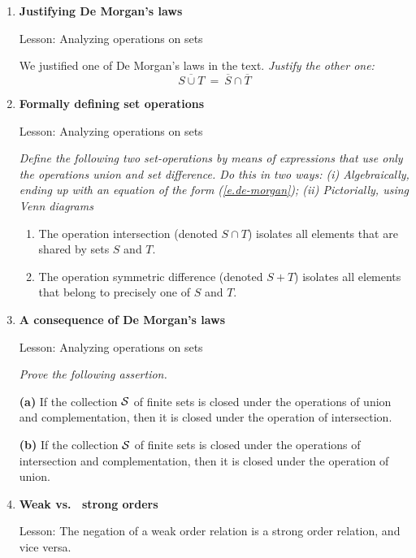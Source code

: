 {\begin{enumerate}
\medskip\item
{\bf Justifying De Morgan's laws}

{\sc Lesson:} Analyzing operations on sets

\smallskip 

We justified one of De Morgan's laws in the text.  {\em Justify the other one:}
\[ \overline{S \cup T} \ = \ \overline{S} \cap \overline{T} \]

\medskip\item
{\bf Formally defining set operations}

{\sc Lesson:} Analyzing operations on sets

\smallskip 

{\em Define the following two set-operations by means of expressions that use only the operations {\sc union} and {\sc set difference}.  Do this in two ways: (i) Algebraically, ending up with an equation of the form (\ref{e.de-morgan}); (ii) Pictorially, using Venn diagrams }
  \begin{enumerate}
  \item
The operation {\sc intersection} (denoted $S \cap T$) isolates all elements that are shared by sets $S$ and $T$.
  \medskip\item
The operation {\sc symmetric difference} (denoted $S+T$) isolates all elements that belong to precisely one of $S$ and $T$.
  \end{enumerate}
  
\medskip\item
{\bf A consequence of De Morgan's laws}

{\sc Lesson:} Analyzing operations on sets

\smallskip

{\em Prove the following assertion.}

\begin{prop}
{\bf (a)}
If the collection $\cal S$ of finite sets is closed under the operations of union and complementation, then it is closed under the operation of intersection.

{\bf (b)}
If the collection $\cal S$ of finite sets is closed under the operations of intersection and complementation, then it is closed under the operation of union.
\end{prop}

\medskip\item
{\bf Weak vs.~ strong orders}

{\sc Lesson:} The negation of a weak order relation is a strong order relation, and vice versa.


\end{enumerate}}
